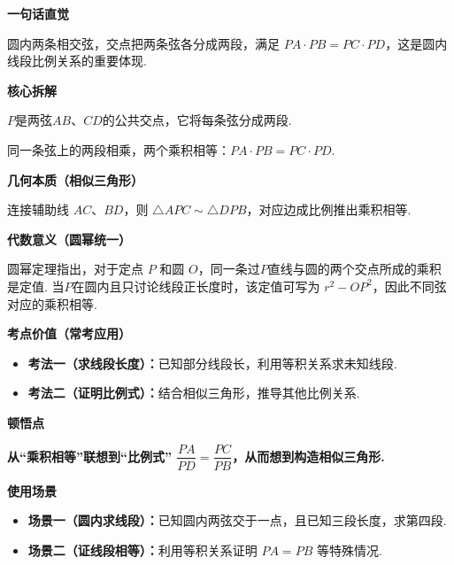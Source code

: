 \begin{explanationbox}
	\textbf{\textcolor{CExplanation}{一句话直觉}}

	圆内两条相交弦，交点把两条弦各分成两段，满足 $PA\cdot PB = PC\cdot PD$，这是圆内线段比例关系的重要体现.

	\medskip
	\textbf{\textcolor{CExplanation}{核心拆解}}

	\begin{description}[style=nextline, leftmargin=2.8em, labelsep=0.5em, itemsep=0.45em]
		\item[\textbf{要点一（交点分弦）：}]
		      $P$是两弦$AB$、$CD$的公共交点，它将每条弦分成两段.
		\item[\textbf{要点二（等积结论）：}]
		      同一条弦上的两段相乘，两个乘积相等：$PA \cdot PB = PC \cdot PD$.
	\end{description}

	\medskip
	\textbf{\textcolor{CExplanation}{几何本质（相似三角形）}}

	连接辅助线 $AC$、$BD$，则 $\triangle APC \sim \triangle DPB$，对应边成比例推出乘积相等.

	\medskip
	\textbf{\textcolor{CExplanation}{代数意义（圆幂统一）}}

	圆幂定理指出，对于定点 $P$ 和圆 $O$，同一条过$P$直线与圆的两个交点所成的乘积是定值. 当$P$在圆内且只讨论线段正长度时，该定值可写为 $r^2-OP^2$，因此不同弦对应的乘积相等.

	\medskip
	\textbf{\textcolor{CExplanation}{考点价值（常考应用）}}

	\begin{itemize}[leftmargin=*, itemsep=0.5em, topsep=0.4em]
		\item \textbf{考法一（求线段长度）：}已知部分线段长，利用等积关系求未知线段.
		\item \textbf{考法二（证明比例式）：}结合相似三角形，推导其他比例关系.
	\end{itemize}

	\medskip
	\textbf{\textcolor{CExplanation}{顿悟点}}

	\textbf{从“乘积相等”联想到“比例式” $\dfrac{PA}{PD}=\dfrac{PC}{PB}$，从而想到构造相似三角形.}

	\medskip
	\textbf{\textcolor{CExplanation}{使用场景}}

	\begin{itemize}[leftmargin=*, itemsep=0.5em, topsep=0.4em]
		\item \textbf{场景一（圆内求线段）：}已知圆内两弦交于一点，且已知三段长度，求第四段.
		\item \textbf{场景二（证线段相等）：}利用等积关系证明 $PA=PB$ 等特殊情况.
	\end{itemize}
\end{explanationbox}